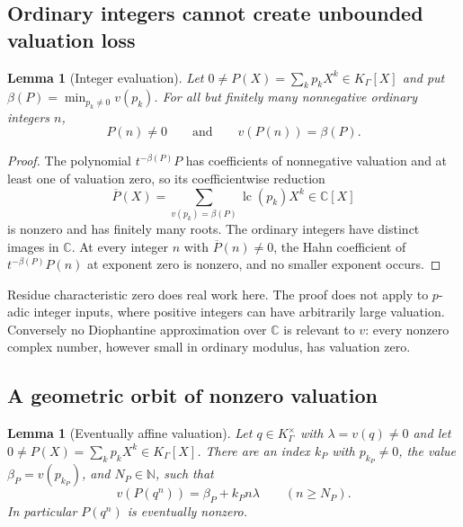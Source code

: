 \documentclass[11pt]{article}
\numberwithin{equation}{section}
\newtheorem{lemma}[theorem]{Lemma}
\theoremstyle{definition}
\theoremstyle{remark}
\newcommand{\C}{\mathbb C}
\newcommand{\N}{\mathbb N}
\newcommand{\K}{K_\Gamma}
\newcommand{\lc}{\operatorname{lc}}
\begin{document}
\subsection{Ordinary integers cannot create unbounded valuation loss}

\begin{lemma}[Integer evaluation]\label{hol:lem:integer}
Let $0\ne P(X)=\sum_kp_kX^k\in\K[X]$ and put $\beta(P)=\min_{p_k\ne0}v(p_k)$.
For all but finitely many nonnegative ordinary integers $n$,
\begin{equation}\label{hol:eq:integerstable}
 P(n)\ne0\qquad\text{and}\qquad v(P(n))=\beta(P).
\end{equation}
\end{lemma}

\begin{proof}
The polynomial $t^{-\beta(P)}P$ has coefficients of nonnegative valuation and
at least one of valuation zero, so its coefficientwise reduction
\[
 \overline P(X)=\sum_{v(p_k)=\beta(P)}\lc(p_k)X^k\in\C[X]
\]
is nonzero and has finitely many roots. The ordinary integers have distinct
images in $\C$. At every integer $n$ with $\overline P(n)\ne0$, the Hahn
coefficient of $t^{-\beta(P)}P(n)$ at exponent zero is nonzero, and no smaller
exponent occurs.
\end{proof}

Residue characteristic zero does real work here. The proof does not apply to
$p$-adic integer inputs, where positive integers can have arbitrarily large
valuation. Conversely no Diophantine approximation over $\C$ is relevant to
$v$: every nonzero complex number, however small in ordinary modulus, has
valuation zero.

\subsection{A geometric orbit of nonzero valuation}

\begin{lemma}[Eventually affine valuation]\label{hol:lem:affine}
Let $q\in\K^\times$ with $\lambda=v(q)\ne0$ and let
$0\ne P(X)=\sum_kp_kX^k\in\K[X]$. There are an index $k_P$ with $p_{k_P}\ne0$,
the value $\beta_P=v(p_{k_P})$, and $N_P\in\N$, such that
\begin{equation}\label{hol:eq:affine}
 v(P(q^n))=\beta_P+k_Pn\lambda\qquad(n\ge N_P).
\end{equation}
In particular $P(q^n)$ is eventually nonzero.
\end{lemma}
\end{document}
